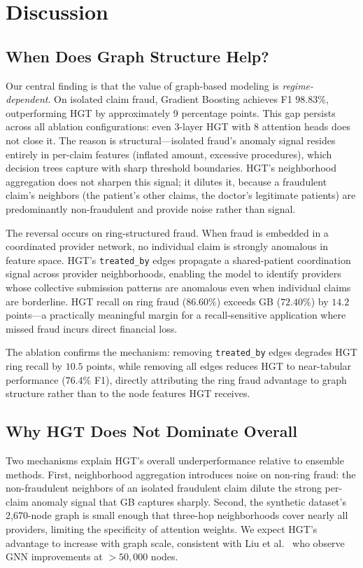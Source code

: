 \documentclass[pdflatex,sn-mathphys-num]{sn-jnl}
\theoremstyle{thmstyleone}
\theoremstyle{thmstyletwo}
\theoremstyle{thmstylethree}
\begin{document}
\section{Discussion}\label{sec:discussion}

\subsection{When Does Graph Structure Help?}

Our central finding is that the value of graph-based modeling is
\emph{regime-dependent}. On isolated claim fraud, Gradient Boosting
achieves F1 $98.83\%$, outperforming HGT by approximately 9 percentage
points. This gap persists across all ablation configurations: even
3-layer HGT with 8 attention heads does not close it. The reason is
structural---isolated fraud's anomaly signal resides entirely in
per-claim features (inflated amount, excessive procedures), which
decision trees capture with sharp threshold boundaries. HGT's
neighborhood aggregation does not sharpen this signal; it dilutes it,
because a fraudulent claim's neighbors (the patient's other claims,
the doctor's legitimate patients) are predominantly non-fraudulent and
provide noise rather than signal.

The reversal occurs on ring-structured fraud. When fraud is embedded in
a coordinated provider network, no individual claim is strongly
anomalous in feature space. HGT's \texttt{treated\_by} edges propagate
a shared-patient coordination signal across provider neighborhoods,
enabling the model to identify providers whose collective submission
patterns are anomalous even when individual claims are borderline.
HGT recall on ring fraud ($86.60\%$) exceeds GB ($72.40\%$) by $14.2$
points---a practically meaningful margin for a recall-sensitive
application where missed fraud incurs direct financial loss.

The ablation confirms the mechanism: removing \texttt{treated\_by}
edges degrades HGT ring recall by $10.5$ points, while removing all
edges reduces HGT to near-tabular performance ($76.4\%$ F1), directly
attributing the ring fraud advantage to graph structure rather than to
the node features HGT receives.

\subsection{Why HGT Does Not Dominate Overall}

Two mechanisms explain HGT's overall underperformance relative to
ensemble methods. First, neighborhood aggregation introduces noise on
non-ring fraud: the non-fraudulent neighbors of an isolated fraudulent
claim dilute the strong per-claim anomaly signal that GB captures
sharply. Second, the synthetic dataset's 2,670-node graph is small
enough that three-hop neighborhoods cover nearly all providers, limiting
the specificity of attention weights. We expect HGT's advantage to
increase with graph scale, consistent with Liu et al.~\cite{liu2021}
who observe GNN improvements at $>50{,}000$ nodes.
\end{document}
